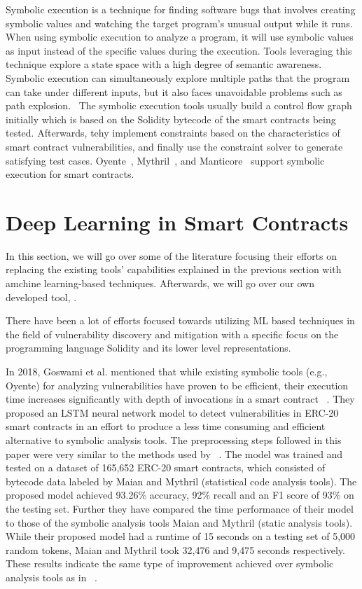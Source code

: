 Symbolic execution is a technique for finding software bugs that involves creating symbolic values and watching the target program's unusual output while it runs.
When using symbolic execution to analyze a program, it will use symbolic values as input instead of the specific values during the execution.
Tools leveraging this technique explore a state space with a high degree of semantic awareness.~\cite{boyer1975select}
Symbolic execution can simultaneously explore multiple paths that the program can take under different inputs, but it also faces unavoidable problems such as path explosion.~\cite{Empirical-Evaluation-of-Smart-Contract-Testing:What-is-the-Best-Choice}
The symbolic execution tools usually build a control flow graph initially which is based on the Solidity bytecode of the smart contracts being tested.
Afterwards, tehy implement constraints based on the characteristics of smart contract vulnerabilities, and finally use the constraint solver to generate satisfying test cases.
Oyente~\cite{oyente}, Mythril~\cite{mythril}, and Manticore~\cite{mossberg2019manticore} support symbolic execution for smart contracts.


\section{Deep Learning in Smart Contracts} \label{sec:dl-models}

In this section, we will go over some of the literature focusing their efforts on replacing the existing tools' capabilities explained in the previous section with amchine learning-based techniques.
Afterwards, we will go over our own developed tool, \slithersimil.

There have been a lot of efforts focused towards utilizing ML based techniques in the field of vulnerability discovery and mitigation with a specific focus on the programming language Solidity and
its lower level representations.

In 2018, Goswami et al. mentioned that while existing symbolic tools (e.g., Oyente) for analyzing vulnerabilities have proven to be efficient, their execution time increases significantly with depth of invocations in a smart contract ~\cite{grech2019gigahorse}.
They proposed an LSTM neural network model to detect vulnerabilities in ERC-20 smart contracts in an effort to produce a less time consuming and efficient alternative to symbolic analysis tools.
The preprocessing steps followed in this paper were very similar to the methods used by ~\cite{madmax}.
The model was trained and tested on a dataset of 165,652 ERC-20 smart contracts, which consisted of bytecode data labeled by Maian and Mythril (statistical code analysis tools).
The proposed model achieved 93.26\% accuracy, 92\% recall and an F1 score of 93\% on the testing set.
Further they have compared the time performance of their model to those of the symbolic analysis tools Maian and Mythril (static analysis tools).
While their proposed model had a runtime of 15 seconds on a testing set of 5,000 random tokens, Maian and Mythril took 32,476 and 9,475 seconds respectively.
These results indicate the same type of improvement achieved over symbolic analysis tools as in ~\cite{grech2019gigahorse}.

